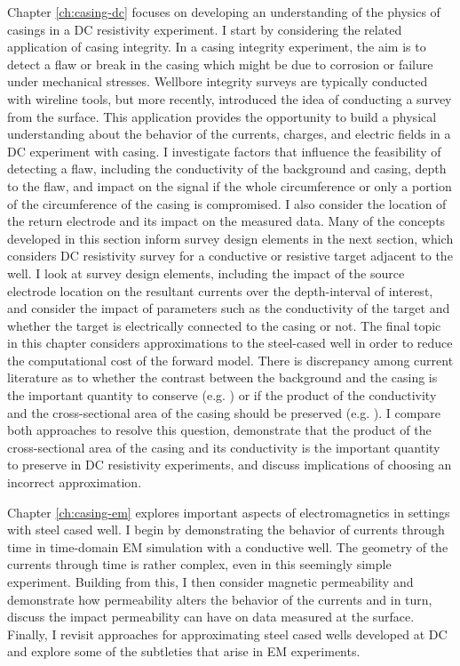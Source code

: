Chapter \ref{ch:casing-dc} focuses on developing an understanding of the physics of casings in a DC resistivity experiment. I start by considering the related application of casing integrity. In a casing integrity experiment, the aim is to detect a flaw or break in the casing which might be due to corrosion or failure under mechanical stresses. Wellbore integrity surveys are typically conducted with wireline tools, but more recently, \cite{Wilt2018} introduced the idea of conducting a survey from the surface. This application provides the opportunity to build a physical understanding about the behavior of the currents, charges, and electric fields in a DC experiment with casing. I investigate factors that influence the feasibility of detecting a flaw, including the conductivity of the background and casing, depth to the flaw, and impact on the signal if the whole circumference or only a portion of the circumference of the casing is compromised. I also consider the location of the return electrode and its impact on the measured data. Many of the concepts developed in this section inform survey design elements in the next section, which considers DC resistivity survey for a conductive or resistive target adjacent to the well. I look at survey design elements, including the impact of the source electrode location on the resultant currents over the depth-interval of interest, and consider the impact of parameters such as the conductivity of the target and whether the target is electrically connected to the casing or not. The final topic in this chapter considers approximations to the steel-cased well in order to reduce the computational cost of the forward model. There is discrepancy among current literature as to whether the contrast between the background and the casing is the important quantity to conserve (e.g. \cite{Um2015}) or if the product of the conductivity and the cross-sectional area of the casing should be preserved (e.g. \cite{Swidinsky2013}). I compare both approaches to resolve this question, demonstrate that the product of the cross-sectional area of the casing and its conductivity is the important quantity to preserve in DC resistivity experiments, and discuss implications of choosing an incorrect approximation.

Chapter \ref{ch:casing-em} explores important aspects of electromagnetics in settings with steel cased well. I begin by demonstrating the behavior of currents through time in time-domain EM simulation with a conductive well. The geometry of the currents through time is rather complex, even in this seemingly simple experiment. Building from this, I then consider magnetic permeability and demonstrate how permeability alters the behavior of the currents and in turn, discuss the impact permeability can have on data measured at the surface. Finally, I revisit approaches for approximating steel cased wells developed at DC and explore some of the subtleties that arise in EM experiments.

